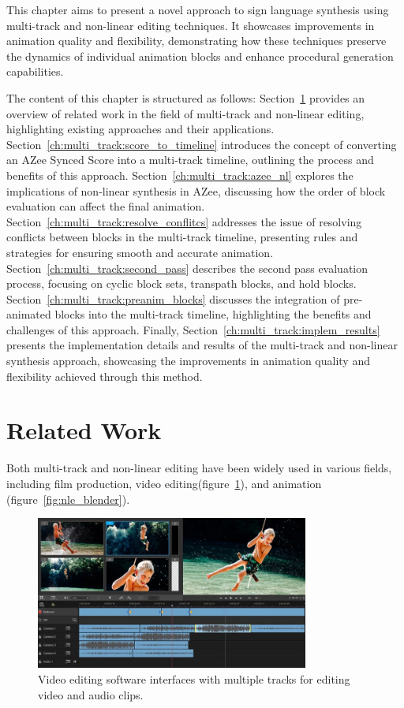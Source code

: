 \documentclass[../../main.tex]{subfiles}
\begin{document}
This chapter aims to present a novel approach to sign language synthesis using multi-track and non-linear editing techniques. It showcases improvements in animation quality and flexibility, demonstrating how these techniques preserve the dynamics of individual animation blocks and enhance procedural generation capabilities.

The content of this chapter is structured as follows: Section~\ref{ch:multi_track:related_work} provides an overview of related work in the field of multi-track and non-linear editing, highlighting existing approaches and their applications. Section~\ref{ch:multi_track:score_to_timeline} introduces the concept of converting an AZee Synced Score into a multi-track timeline, outlining the process and benefits of this approach. Section~\ref{ch:multi_track:azee_nl} explores the implications of non-linear synthesis in AZee, discussing how the order of block evaluation can affect the final animation. Section~\ref{ch:multi_track:resolve_conflitcs} addresses the issue of resolving conflicts between blocks in the multi-track timeline, presenting rules and strategies for ensuring smooth and accurate animation. Section~\ref{ch:multi_track:second_pass} describes the second pass evaluation process, focusing on cyclic block sets, transpath blocks, and hold blocks. Section~\ref{ch:multi_track:preanim_blocks} discusses the integration of pre-animated blocks into the multi-track timeline, highlighting the benefits and challenges of this approach. Finally, Section~\ref{ch:multi_track:implem_results} presents the implementation details and results of the multi-track and non-linear synthesis approach, showcasing the improvements in animation quality and flexibility achieved through this method.

\section{Related Work}
\label{ch:multi_track:related_work}

Both multi-track and non-linear editing have been widely used in various fields, including film production, video editing(figure~\ref{fig:video_edit}), and animation (figure~\ref{fig:nle_blender}). 

\begin{figure}[h]
    \centering
    \includegraphics[width=0.8\textwidth]{chapters/multi_track/images/video_editing.png}
    \caption{Video editing software interfaces with multiple tracks for editing video and audio clips.}
    \label{fig:video_edit}
\end{figure}
\end{document}
